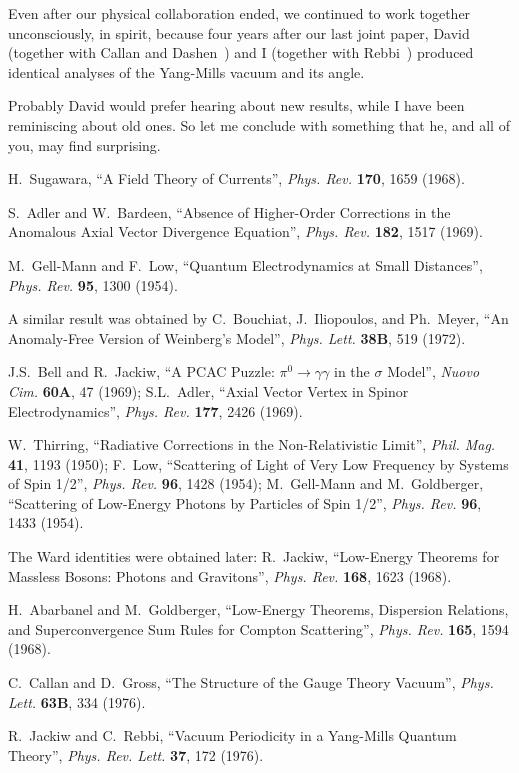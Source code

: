 \documentclass[a4paper,12pt,twoside]{article}
\def\Journal#1#2#3#4{{\em #1} {\bf #2}, #3 (#4)}
\def\PLB{Phys. Lett.} %
\def\PRL{Phys. Rev. Lett.}
\def\PR{Phys. Rev.}
\begin{document}
Even after our physical collaboration ended, we continued to work together
unconsciously, in spirit, because four years after our last joint paper, David (together
with Callan and Dashen~\cite{ref9A})  and I (together with Rebbi~\cite{ref10A})
produced identical analyses of the Yang-Mills vacuum and its angle.

Probably David would prefer hearing about new results, while I have been
reminiscing about old ones. So let me conclude with something that he, and all of you,
may find surprising.

\begin{thebibliography}{99}

 H.~Sugawara, ``A Field Theory of Currents'',
\Journal{\PR}{170}{1659}{1968}.

 S.~Adler and W.~Bardeen, ``Absence of Higher-Order Corrections
in the Anomalous Axial Vector Divergence Equation'',
\Journal{\PR}{182}{1517}{1969}.

 M.~Gell-Mann and F.~Low, ``Quantum Electrodynamics at Small
Distances'', \Journal{\PR}{95}{1300}{1954}.

 A similar result was obtained by C.~Bouchiat, J.~Iliopoulos, and
Ph.~Meyer, ``An Anomaly-Free Version of Weinberg's Model'',
\Journal{\PLB}{38B}{519}{1972}.

 J.S.~Bell and R.~Jackiw, ``A PCAC Puzzle: $\pi^0 \to \gamma\gamma$
in the $\sigma$ Model'', \Journal{Nuovo Cim.}{60A}{47}{1969}; S.L.~Adler, ``Axial
Vector Vertex in Spinor Electrodynamics'', \Journal{\PR}{177}{2426}{1969}.

 W.~Thirring, ``Radiative Corrections in the Non-Relativistic Limit'',
\Journal{Phil. Mag.}{41}{1193}{1950}; F.~Low, ``Scattering of Light of Very Low
Frequency by Systems of Spin 1/2'', \Journal{\PR}{96}{1428}{1954}; M.~Gell-Mann
and M.~Goldberger, ``Scattering of Low-Energy Photons by Particles of Spin
1/2'', \Journal{\PR}{96}{1433}{1954}.

 The Ward identities were obtained later: R.~Jackiw,
 ``Low-Energy Theorems for Massless Bosons: Photons
and Gravitons'', \Journal{\PR}{168}{1623}{1968}. 

 H.~Abarbanel and M.~Goldberger, ``Low-Energy Theorems, Dispersion
Relations, and Superconvergence Sum Rules for Compton Scattering'',
\Journal{\PR}{165}{1594}{1968}.

 C.~Callan and D.~Gross, ``The Structure of the Gauge Theory Vacuum'',
\Journal{\PLB}{63B}{334}{1976}.

 R.~Jackiw and C.~Rebbi, ``Vacuum Periodicity in a Yang-Mills
Quantum Theory'', \Journal{\PRL}{37}{172}{1976}.

\end{thebibliography}
\end{document}
